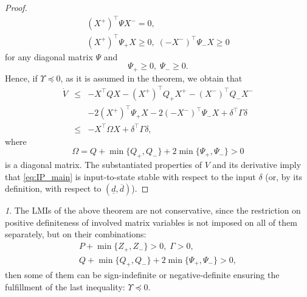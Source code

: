 \documentclass[letterpaper, 10 pt, conference]{ieeeconf}
\theoremstyle{plain}
\theoremstyle{definition}
\theoremstyle{plain}
\theoremstyle{plain}
\theoremstyle{remark}
\newtheorem{rem}{\protect\remarkname}
\providecommand{\remarkname}{Remark}
\begin{document}
\begin{proof}
\begin{gather*}
(X^{+})^{\top}\Psi X^{-}=0,\\
(X^{+})^{\top}\Psi_{+}X\geq0,\;(-X^{-})^{\top}\Psi_{-}X\geq0
\end{gather*}
for any diagonal matrix $\Psi$ and
\[
\Psi_{+}\geq0,\;\Psi_{-}\geq0.
\]
Hence, if $\Upsilon\preceq0$, as it is assumed in the theorem, we obtain that
\begin{eqnarray*}
\dot{V} & \leq & -X^{\top}QX-(X^{+})^{\top}Q_{+}X^{+}-(X^{-})^{\top}Q_{-}X^{-}\\
 &  & -2(X^{+})^{\top}\Psi_{+}X-2(-X^{-})^{\top}\Psi_{-}X+\delta^{\top}\Gamma\delta\\
 & \leq & -X^{\top}\Omega X+\delta^{\top}\Gamma\delta,
\end{eqnarray*}
where
\[
\Omega=Q+\min\{Q_{+},Q_{-}\}+2\min\{\Psi_{+},\Psi_{-}\}>0
\]
is a diagonal matrix. The substantiated properties of $V$ and its derivative imply that \eqref{eq:IP_main} is input-to-state stable \cite{Khalil2002} with respect to the input $\delta$ (or, by its definition, with respect to $(\underline{d},\overline{d})$).
\end{proof}
\begin{rem}
\label{rem:combination}
The LMIs of the above theorem are not conservative, since the restriction on positive definiteness of involved matrix variables is not imposed on all of them separately, but on their combinations:
\begin{gather*}
P+\min\{Z_{+},Z_{-}\}>0,\;\Gamma>0,\\
Q+\min\{Q_{+},Q_{-}\}+2\min\{\Psi_{+},\Psi_{-}\}>0,
\end{gather*}
then some of them can be sign-indefinite or negative-definite ensuring the fulfillment of the last inequality:
$
\Upsilon\preceq0.
$
\end{rem}
\end{document}
